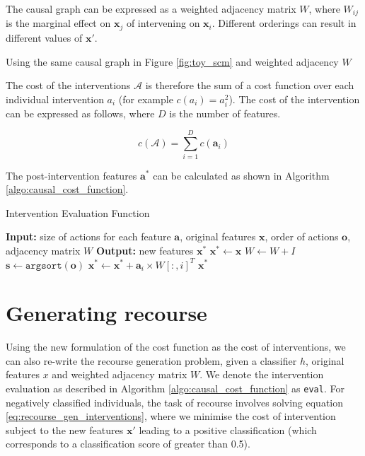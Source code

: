 The causal graph can be expressed as a weighted adjacency matrix $W$, where $W_{ij}$ is the marginal effect on $\mathbf{x}_j$ of intervening on $\mathbf{x}_i$. Different orderings can result in different values of $\mathbf{x}'$.

Using the same causal graph in Figure \ref{fig:toy_scm} and weighted adjacency $W$ 

The cost of the interventions $\mathcal{A}$ is therefore the sum of a cost function over each individual intervention $a_i$ (for example $c(a_i) = a_i^2$). The cost of the intervention can be expressed as follows, where $D$ is the number of features. 

\begin{equation}
	c(\mathcal{A}) = \sum_{i=1}^D c(\mathbf{a}_i)
\end{equation}

The post-intervention features $\mathbf{a}^*$ can be calculated as shown in Algorithm \ref{algo:causal_cost_function}.

\begin{algorithm}
	\caption{Intervention Evaluation Function}
	\begin{algorithmic}[1]
		\State \textbf{Input:} size of actions for each feature $\mathbf{a}$, original features $\mathbf{x}$, order of actions $\mathbf{o}$, adjacency matrix $W$
		\State \textbf{Output:} new features $\textbf{x}^*$
		\State $\textbf{x}^* \leftarrow \textbf{x}$
		\State $W \leftarrow W + I$ 
		\State $\mathbf{s} \leftarrow \texttt{argsort}(\mathbf{o})$
		\State $\textbf{x}^* \leftarrow \textbf{x}^* + \mathbf{a}_i \times W[:,i]^{T}$ 
		\EndFor
		\State \Return $\mathbf{x}^*$
		\EndFunction
	\end{algorithmic}
	\label{algo:causal_cost_function}
\end{algorithm}

\section{Generating recourse}

Using the new formulation of the cost function as the cost of interventions, we can also re-write the recourse generation problem, given a classifier $h$, original features $x$ and weighted adjacency matrix $W$. We denote the intervention evaluation as described in Algorithm \ref{algo:causal_cost_function} as \texttt{eval}. For negatively classified individuals, the task of recourse involves solving equation \ref{eq:recourse_gen_interventions}, where we minimise the cost of intervention subject to the new features $\mathbf{x}'$ leading to a positive classification (which corresponds to a classification score of greater than 0.5).

